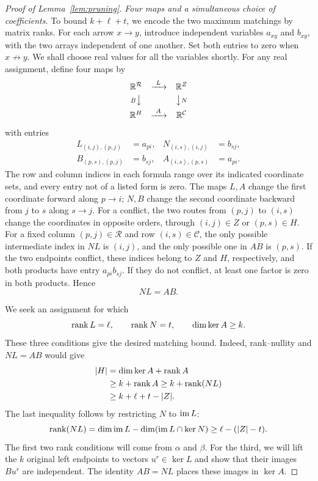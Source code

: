 \begin{proof}[Proof of Lemma~\ref{lem:pruning}]
\medskip\noindent
\emph{Four maps and a simultaneous choice of coefficients.}
To bound $k+\ell+t$, we encode the two maximum matchings by matrix ranks.
For each arrow $x\to y$, introduce independent variables $a_{xy}$ and
$b_{xy}$, with the two arrays independent of one another.  Set both
entries to zero when $x\not\to y$.  We shall choose real values for all
the variables shortly.  For any real assignment, define four maps by
\[
 \begin{array}{ccc}
 \mathbb R^{\mathcal R}&\xrightarrow{\ L\ }&\mathbb R^Z\\[3pt]
 {\scriptstyle B}\big\downarrow&&\big\downarrow{\scriptstyle N}\\[3pt]
 \mathbb R^H&\xrightarrow{\ A\ }&\mathbb R^{\mathcal C}
 \end{array}
\]
with entries
\begin{equation}\label{eq:pruning-maps}
 \begin{aligned}
 L_{(i,j),(p,j)}&=a_{pi},&
 N_{(i,s),(i,j)}&=b_{sj},\\
 B_{(p,s),(p,j)}&=b_{sj},&
 A_{(i,s),(p,s)}&=a_{pi}.
 \end{aligned}
\end{equation}
The row and column indices in each formula range over its indicated
coordinate sets, and every entry not of a listed form is zero.
The maps $L,A$ change the first coordinate forward along $p\to i$;
$N,B$ change the second coordinate backward from $j$ to $s$ along $s\to j$.
For a conflict, the two routes from $(p,j)$ to $(i,s)$ change the
coordinates in opposite orders, through $(i,j)\in Z$ or $(p,s)\in H$.
For a fixed column $(p,j)\in\mathcal R$ and row
$(i,s)\in\mathcal C$, the only possible intermediate index in $NL$ is
$(i,j)$, and the only possible one in $AB$ is $(p,s)$.  If the two
endpoints conflict, these indices belong to $Z$ and $H$, respectively,
and both products have entry $a_{pi}b_{sj}$.  If they do not conflict,
at least one factor is zero in both products.  Hence
\begin{equation}\label{eq:pruning-commute}
 NL=AB.
\end{equation}

We seek an assignment for which
\[
 \operatorname{rank} L=\ell,\qquad \operatorname{rank} N=t,\qquad \dim\ker A\geq k.
\]
These three conditions give the desired matching bound. Indeed,
rank--nullity and $NL=AB$ would give
\begin{align}
 \lvert H\rvert
 &=\dim\ker A+\operatorname{rank} A\notag\\
 &\geq k+\operatorname{rank} A
 \geq k+\operatorname{rank}(NL)\notag\\
 &\geq k+\ell+t-\lvert Z\rvert.
 \label{eq:pruning-rank-bound}
\end{align}
The last inequality follows by restricting $N$ to $\operatorname{im} L$:
\[
 \operatorname{rank}(NL)
 =\dim\operatorname{im} L-\dim(\operatorname{im} L\cap\ker N)
 \geq\ell-(\lvert Z\rvert-t).
\]
The first two rank conditions will come from $\alpha$ and $\beta$.
For the third, we will lift the $k$ original left endpoints to vectors
$u^r\in\ker L$ and show that their images $Bu^r$ are independent.
The identity $AB=NL$ places these images in $\ker A$.


\end{proof}
